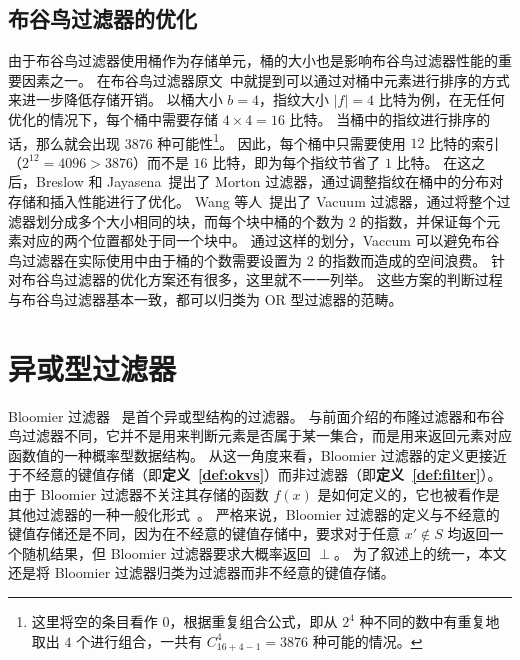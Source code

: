 
\subsection{布谷鸟过滤器的优化}

由于布谷鸟过滤器使用桶作为存储单元，桶的大小也是影响布谷鸟过滤器性能的重要因素之一。
在布谷鸟过滤器原文~\cite{fan2014cuckoo}中就提到可以通过对桶中元素进行排序的方式来进一步降低存储开销。
以桶大小 $b=4$，指纹大小 $|f| = 4$ 比特为例，在无任何优化的情况下，每个桶中需要存储 $4\times 4 = 16$ 比特。
当桶中的指纹进行排序的话，那么就会出现 \num{3876} 种可能性\footnote{这里将空的条目看作 $0$，根据重复组合公式，即从 $2^4$ 种不同的数中有重复地取出 $4$ 个进行组合，一共有 $C_{16 + 4 - 1}^4 = 3876$ 种可能的情况。}。
因此，每个桶中只需要使用 $12$ 比特的索引（$2^{12}=4096>3876$）而不是 $16$ 比特，即为每个指纹节省了 $1$ 比特。
在这之后，Breslow 和 Jayasena~\cite{breslow2020morton}提出了 Morton 过滤器，通过调整指纹在桶中的分布对存储和插入性能进行了优化。
Wang 等人~\cite{wang2019vacuum}提出了 Vacuum 过滤器，通过将整个过滤器划分成多个大小相同的块，而每个块中桶的个数为 $2$ 的指数，并保证每个元素对应的两个位置都处于同一个块中。
通过这样的划分，Vaccum 可以避免布谷鸟过滤器在实际使用中由于桶的个数需要设置为 $2$ 的指数而造成的空间浪费。
针对布谷鸟过滤器的优化方案还有很多，这里就不一一列举。
这些方案的判断过程与布谷鸟过滤器基本一致，都可以归类为 OR 型过滤器的范畴。

\section{异或型过滤器}\label{sec:xor-based-filters}

Bloomier 过滤器~\cite{chazelle2004bloomier,charles2008bloomier} 是首个异或型结构的过滤器。
与前面介绍的布隆过滤器和布谷鸟过滤器不同，它并不是用来判断元素是否属于某一集合，而是用来返回元素对应函数值的一种概率型数据结构。
从这一角度来看，Bloomier 过滤器的定义更接近于不经意的键值存储（即\textbf{定义~\ref{def:okvs}}）而非过滤器（即\textbf{定义~\ref{def:filter}}）。
由于 Bloomier 过滤器不关注其存储的函数 $f(x)$ 是如何定义的，它也被看作是其他过滤器的一种一般化形式~\cite{graf2020xor,li2023chainedfilter}。
严格来说，Bloomier 过滤器的定义与不经意的键值存储还是不同，因为在不经意的键值存储中，要求对于任意 $x'\notin S$ 均返回一个随机结果，但 Bloomier 过滤器要求大概率返回 $\perp$。
为了叙述上的统一，本文还是将 Bloomier 过滤器归类为过滤器而非不经意的键值存储。

